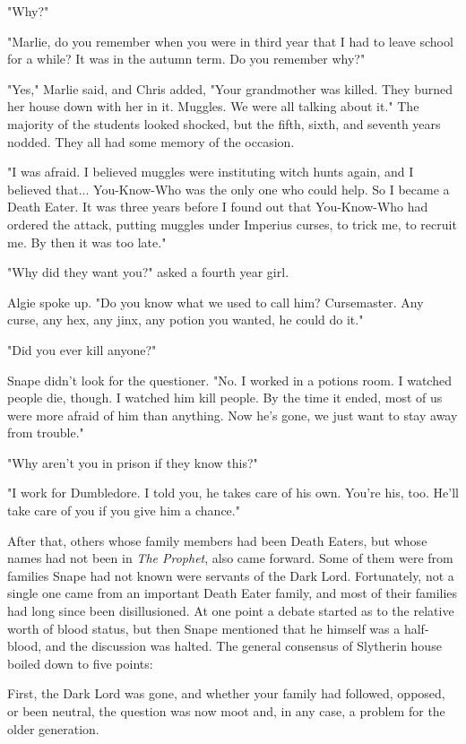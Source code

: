 "Why?"

"Marlie, do you remember when you were in third year that I had to leave school for a while? It was in the autumn term. Do you remember why?"

"Yes," Marlie said, and Chris added, "Your grandmother was killed. They burned her house down with her in it. Muggles. We were all talking about it." The majority of the students looked shocked, but the fifth, sixth, and seventh years nodded. They all had some memory of the occasion.

"I was afraid. I believed muggles were instituting witch hunts again, and I believed that... You-Know-Who was the only one who could help. So I became a Death Eater. It was three years before I found out that You-Know-Who had ordered the attack, putting muggles under Imperius curses, to trick me, to recruit me. By then it was too late."

"Why did they want you?" asked a fourth year girl.

Algie spoke up. "Do you know what we used to call him? Cursemaster. Any curse, any hex, any jinx, any potion you wanted, he could do it."

"Did you ever kill anyone?"

Snape didn't look for the questioner. "No. I worked in a potions room. I watched people die, though. I watched him kill people. By the time it ended, most of us were more afraid of him than anything. Now he's gone, we just want to stay away from trouble."

"Why aren't you in prison if they know this?"

"I work for Dumbledore. I told you, he takes care of his own. You're his, too. He'll take care of you if you give him a chance."

After that, others whose family members had been Death Eaters, but whose names had not been in \emph{The Prophet}, also came forward. Some of them were from families Snape had not known were servants of the Dark Lord. Fortunately, not a single one came from an important Death Eater family, and most of their families had long since been disillusioned. At one point a debate started as to the relative worth of blood status, but then Snape mentioned that he himself was a half-blood, and the discussion was halted. The general consensus of Slytherin house boiled down to five points:

First, the Dark Lord was gone, and whether your family had followed, opposed, or been neutral, the question was now moot and, in any case, a problem for the older generation.

